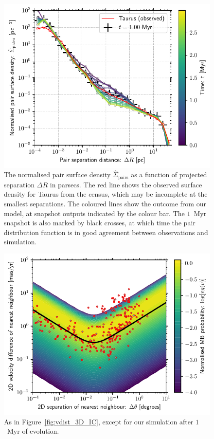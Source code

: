 \documentclass{aa}
\begin{document}
\begin{figure}
    \centering
    \includegraphics[width=\columnwidth]{Figures/pairwise_separation.pdf}
    \caption{The normalised pair surface density $\hat{\Sigma}_\mathrm{pairs}$ as a function of projected separation $\Delta R$ in parsecs. The red line shows the observed surface density for Taurus from the \citet{Luhman23} census, which may be incomplete at the smallest separations. The coloured lines show the outcome from our model, at snapshot outputs indicated by the colour bar. {The $1$~Myr snapshot is also marked by black crosses, at which time the pair distribution function is in good agreement between observations and simulation.}}
    \label{fig:ic_pairs}
\end{figure}


\begin{figure}
    \centering
    \includegraphics[width=\columnwidth]{Figures/vdist_2D_final.pdf}
    \caption{As in Figure~\ref{fig:vdist_3D_IC}, except for our simulation after $1$~Myr of evolution. }
    \label{fig:vdist_3D}
\end{figure}
\end{document}
